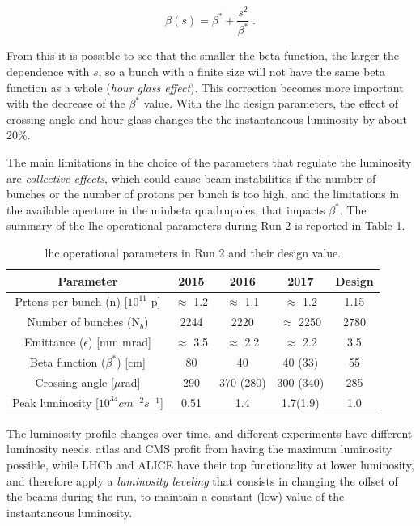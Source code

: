 \begin{equation}
\beta(s) = \beta^* + \frac{s^2}{\beta^*} \; .
\end{equation}

From this it is possible to see that the smaller the beta function, the larger the dependence with $s$, so a bunch with a finite size will not have the same beta function as a whole (\textit{hour glass effect}). This correction becomes more important with the decrease of the $\beta^*$ value. With the \gls{lhc} design parameters, the effect of crossing angle and hour glass changes the the instantaneous luminosity by about 20\%.

The main limitations in the choice of the parameters that regulate the luminosity are \textit{collective effects}, which could cause beam instabilities if the number of bunches or the number of protons per bunch is too high, and the limitations in the available aperture in the minbeta quadrupoles, that impacts $\beta^*$. The summary of the \gls{lhc} operational parameters during Run 2 is reported in Table \ref{tab:lhc:param}.


\begin{table}[ht]
\begin{center}
\begin{tabular}{c c c c c }
\hline 
Parameter & 2015 & 2016 & 2017 & Design \\ 
\hline 
\hline
Prtons per bunch (n) [$10^{11}$ p] & $\approx$ 1.2 & $\approx$ 1.1 & $\approx$ 1.2 & 1.15 \\ 
\hline 
Number of bunches (N$_b$) & 2244 & 2220 & $\approx$ 2250 & 2780 \\ 
\hline 
Emittance ($\epsilon$) [mm mrad] & $\approx$ 3.5 & $\approx$ 2.2 & $\approx$ 2.2 & 3.5 \\ 
\hline 
Beta function ($\beta^*$) [cm] & 80 & 40 & 40 (33) & 55 \\
\hline
Crossing angle [$\mu$rad] & 290 & 370 (280) & 300 (340) & 285 \\
\hline
Peak luminosity [$10^{34} cm^{-2}s^{-1}$] & 0.51 & 1.4 & 1.7(1.9) & 1.0 \\
\hline
\end{tabular}
\end{center}
\caption{\gls{lhc} operational parameters in Run 2 and their design value.}
\label{tab:lhc:param}
\end{table}


The luminosity profile changes over time, and different experiments have different luminosity needs. \gls{atlas} and CMS profit from having the maximum luminosity possible, while LHCb and ALICE have their top functionality at lower luminosity, and therefore apply a \textit{luminosity leveling} that consists in changing the offset of the beams during the run, to maintain a constant (low) value of the instantaneous luminosity.

